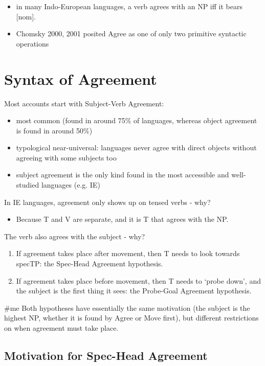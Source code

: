 \begin{itemize}
  \item in many Indo-European languages, a verb agrees with an NP iff it bears [nom].
  \item Chomsky 2000, 2001 posited Agree as one of only two primitive syntactic operations
\end{itemize}

\section*{Syntax of Agreement}

Most accounts start with Subject-Verb Agreement:

\begin{itemize}
  \item most common (found in around 75\% of languages, whereas object agreement is found in around 50\%)
  \item typological near-universal: languages never agree with direct objects without agreeing with some subjects too
  \item subject agreement is the only kind found in the most accessible and well-studied languages (e.g. IE)
\end{itemize}

In IE languages, agreement only shows up on tensed verbs - why?

\begin{itemize}
  \item Because T and V are separate, and it is T that agrees with the NP.
\end{itemize}

The verb also agrees with the subject - why?

\begin{enumerate}
  \item If agreement takes place after movement, then T needs to look towards specTP: the Spec-Head Agreement hypothesis.
  \item If agreement takes place before movement, then T needs to `probe down', and the subject is the first thing it sees: the Probe-Goal Agreement hypothesis.
\end{enumerate}
\#me Both hypotheses have essentially the same motivation (the subject is the highest NP, whether it is found by Agree or Move first), but different restrictions on when agreement must take place.

\subsection*{Motivation for Spec-Head Agreement}

